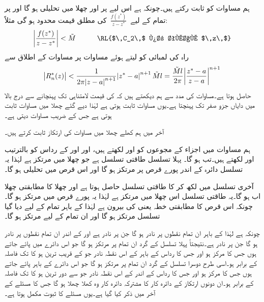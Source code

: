 ہم مساوات  کو ثابت رکتے ہیں۔چونکہ  ہے اس لیے  پر اور چھلا میں  تحلیلی ہو گا اور   پر تمام  کے لیے 
$\,\tfrac{f(z^*)}{z-z^*}\,$
کی مطلق قیمت محدود ہو گی مثلاً:
\begin{align*}
\abs{\frac{f(z^*)}{z-z^*}}<\tilde{M}\quad \quad \quad \text{\RL{$\,C_2\,$ پر تمام $\,z\,$}}
\end{align*}
راہ  کی لمبائی کو  لیتے ہوئے  مساوات  پر مساوات  کے اطلاق سے
\begin{align*}
\abs{R^*_n(z)}<\frac{1}{2\pi\abs{z-a}^{n+1}}\abs{z^*-a}^{n+1}\tilde{M} l=\frac{\tilde{M}l}{2\pi}\abs{\frac{z^*-a}{z-a}}^{n+1}
\end{align*}
حاصل ہوتا ہے۔مساوات  کی مدد سے ہم دیکھتے ہیں کہ  کی قیمت لامتناہی تک پہنچانے سے درج بالا میں دایاں جزو صفر تک پہنچتا ہے۔یوں مساوات  ثابت ہوتی ہے لہٰذا دیے گئے چھلا میں مساوات  ثابت ہوتی ہے جس کے  ضریب  مساوات  دیتی ہے۔

آخر میں ہم کھلے چھلا میں مساوات  کی ارتکاز ثابت کرتے ہیں۔

ہم مساوات  میں  اجزاء کے مجوعوں کو  اور  لکھتے ہیں، اور  اور  کے رداس کو بالترتیب  اور  لکھتے ہیں۔تب  ہو گا۔ پہلا تسلسل طاقتی تسلسل ہے جو  چھلا میں مرتکز ہے  لہٰذا یہ تسلسل دائرہ  کے اندر پورے قرص پر مرتکز ہو گا اور  اس قرص میں تحلیلی ہو گا۔

آخری تسلسل میں  لکھ کر  کا طاقتی تسلسل حاصل ہوتا ہے اور چھلا  کا مطابقتی چھلا اب
  ہو گا۔یہ طاقتی تسلسل اس چھلا میں مرتکز ہے لہٰذا یہ پورے قرص  میں مرتکز ہو گا۔چونکہ اس  قرص کا مطابقتی خطہ  یعنی  کی بیرون ہے لہٰذا  کے باہر تمام  کے لیے دیا گیا تسلسل مرتکز ہو گا اور  ان تمام  کے لیے مرتکز ہو گا۔

چونکہ  ہے لہٰذا  کے باہر ان تمام نقطوں پر  نادر ہو گا جن پر  نادر ہے اور  کے اندر ان تمام نقطوں پر  نادر ہو گا جن پر  نادر ہے۔نتیجتاً پہلا تسلسل  کے گرد ان تمام  پر مرتکز ہو گا جو  اس دائرے میں پائے جاتے ہوں جس کا مرکز  ہو اور جس کا رداس   کے باہر  کے اس نقطہ نادر جو  کے قریب ترین ہو کا  تک فاصلہ کے برابر ہو۔اسی طرح دوسرا تسلسل  کے گرد ان تمام  پر مرتکز ہو گا جو  اس دائرے کے باہر پائے جاتے ہوں جس کا مرکز  ہو اور جس کا رداس   کے اندر   کے اس نقطہ نادر جو  سے دور ترین ہو کا  تک فاصلہ کے برابر ہو۔ان دونوں  ارتکاز کے دائرہ کار کا مشترکہ دائرہ کار وہ کھلا چھلا ہو گا جس کا مسئلے کے آخر  میں ذکر کیا گیا ہے۔یوں مسئلے کا ثبوت مکمل ہوتا ہے۔  

